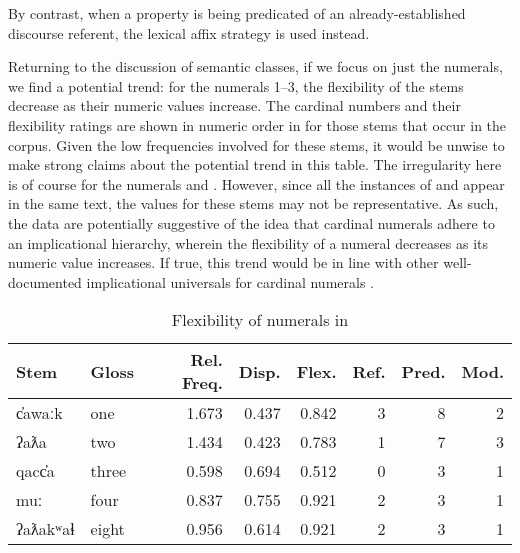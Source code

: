 \noindent By contrast, when a property is being predicated of an already-established discourse referent, the lexical affix strategy is used instead.

Returning to the discussion of semantic classes, if we focus on just the numerals, we find a potential trend: for the numerals 1–3, the flexibility of the stems decrease as their numeric values increase. The cardinal numbers and their flexibility ratings are shown in numeric order in  for those stems that occur in the corpus. Given the low frequencies involved for these stems, it would be unwise to make strong claims about the potential trend in this table. The irregularity here is of course for the numerals  and . However, since all the instances of  and  appear in the same text, the values for these stems may not be representative. As such, the data are potentially suggestive of the idea that cardinal numerals adhere to an implicational hierarchy, wherein the flexibility of a numeral decreases as its numeric value increases. If true, this trend would be in line with other well-documented implicational universals for cardinal numerals \parencites{DehaeneMehler1992}[141]{Croft2003}.

\begin{table}[h!]
  \centering
  \caption{Flexibility of numerals in }
  \label{tab:Nuuchahnulth-numerals}
  \begin{tabular}{ l l r r r r r r }
    \toprule
    Stem & Gloss & Rel. Freq. & Disp. & Flex. & Ref. & Pred. & Mod.\\
    \midrule
    c̓awaːk   & one   & 1.673 & 0.437 & 0.842 & 3 & 8 & 2\\
    ʔaƛa     & two   & 1.434 & 0.423 & 0.783 & 1 & 7 & 3\\
    qacc̓a    & three & 0.598 & 0.694 & 0.512 & 0 & 3 & 1\\
    muː      & four  & 0.837 & 0.755 & 0.921 & 2 & 3 & 1\\
    ʔaƛakʷaɬ & eight & 0.956 & 0.614 & 0.921 & 2 & 3 & 1\\
    \bottomrule
  \end{tabular}
\end{table}

